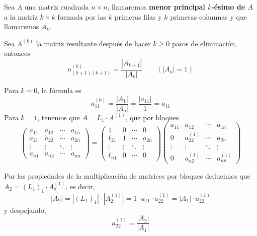     \begin{defin}
        Sea $A$ una matriz cuadrada $n \times n$, llamaremos \textbf{menor principal $k$-ésimo de $A$} a la matriz $k \times k$ formada por las $k$ primeras filas y $k$ primeras columnas y que llamaremos $A_k$.  
    \end{defin}
    \begin{lem}
        Sea $A^{(k)}$ la matriz resultante después de hacer $k \geq 0$ pasos de eliminación, entonces
        $$a^{(k)}_{(k+1)(k+1)}=\dfrac{|A_{k+1}|}{|A_k|} \qquad (|A_o|=1)$$
    \end{lem}
    \begin{dem}
        Para $k=0$, la fórmula es 
        $$a_{11}^{(0)}=\dfrac{|A_1|}{|A_o|}=\dfrac{|a_{11}|}{1}=a_{11}$$
        Para $k=1$, tenemos que $A=L_1 \cdot A^{(1)}$, que por bloques
        $$\left(\begin{array}{cc|cc}
             a_{11} &  a_{12} & \cdots & a_{1n}\\
             a_{21} &  a_{22} & \cdots & a_{2n} \\
             \hline \vdots & \vdots & \ddots &\vdots\\
             a_{n1} &  a_{n2} & \cdots & a_{nn}
        \end{array} \right)=\left(\begin{array}{cc|cc}
             1 &  0  & \cdots&  0\\
             \ell_{21} &  1 & \cdots & a_{2n} \\
             \hline \vdots & \vdots &\ddots &\vdots \\
             \ell_{n1} &  0 & \cdots & 0
        \end{array} \right)\left(\begin{array}{cc|cc}
             a_{11} &  a_{12} & \cdots & a_{1n}\\
             0 &  a_{22}^{(1)} & \cdots & a_{2n} \\
             \hline \vdots & \vdots & \ddots &\vdots \\
             0 &  a_{n2}^{(1)} & \cdots & a_{nn}^{(1)}
        \end{array} \right)$$
       
        Por las propiedades de la multiplicación de matrices por bloques deducimos \newline que $A_2=(L_1)_1 \cdot A_2^{(1)}$, es decir, 
        $$|A_2|=|(L_1)_1|\cdot |A_2^{(1)}|=1 \cdot a_{11} \cdot a_{22}^{(1)}=|A_1| \cdot a_{22}^{(1)}$$
        y despejando, $$a_{22}^{(1)}=\dfrac{|A_2|}{|A_1|}$$


\end{dem}
